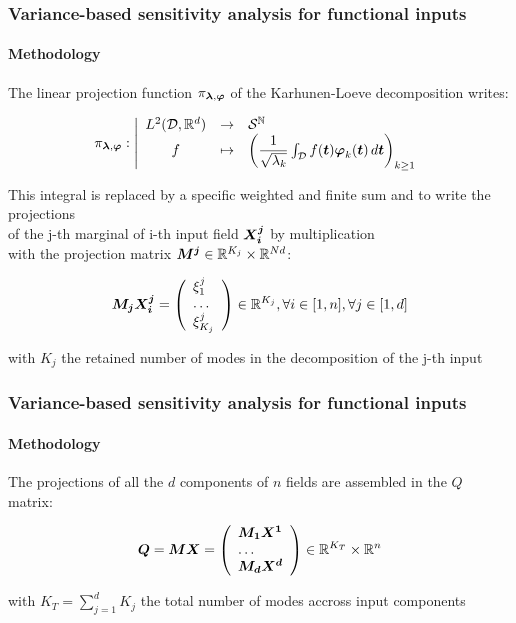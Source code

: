 \documentclass[aspectratio=169]{beamer}
\begin{document}
\begin{frame}
\frametitle{Variance-based sensitivity analysis for functional inputs}

\framesubtitle{Methodology}

The linear projection function $\pi_{ {\mathbf{\boldsymbol{{\lambda}}}}, {\mathbf{\boldsymbol{{\varphi}}}}}$ of
the Karhunen-Loeve decomposition writes:

$$
    \pi_{{\mathbf{\boldsymbol{{\lambda}}}}, {\mathbf{\boldsymbol{{\varphi}}}}}: \left|
      \begin{array}{ccl}
        L^2({\mathcal D}, \mathbb{R}^d) & \rightarrow & {\mathcal S}^{{\mathbb N}} \\
        f & \mapsto &\left(\dfrac{1}{\sqrt{\lambda_k}}\int_{{\mathcal D}}f({\mathbf{\boldsymbol{{t}}}}) {\mathbf{\boldsymbol{{\varphi}}}}_k({\mathbf{\boldsymbol{{t}}}})\, d{\mathbf{\boldsymbol{{t}}}}\right)_{k \geq 1}
      \end{array}
    \right.
$$

This integral is replaced by a specific weighted and finite sum and to write the projections\\
of the j-th marginal of i-th input field ${\mathbf{\boldsymbol{{X_i^j}}}}$ by multiplication\\
with the projection matrix ${{\mathbf{\boldsymbol{{{\mathbf{\boldsymbol{{M^j}}}}}}}}} \in \mathbb{R}^{K_j} \times \mathbb{R}^{Nd}$:

$$
    {{\mathbf{\boldsymbol{{{\mathbf{\boldsymbol{{M_j}}}}}}}}} {\mathbf{\boldsymbol{{X_i^j}}}} = \left( \begin{array}{l} \xi_1^j \\ \dots \\ \xi_{K_j}^j \end{array} \right)
    \in \mathbb{R}^{K_j}, \forall i \in [1, n], \forall j \in [1, d]
$$

with $K_j$ the retained number of modes in the decomposition of the j-th input

\end{frame}

\begin{frame}
\frametitle{Variance-based sensitivity analysis for functional inputs}

\framesubtitle{Methodology}

The projections of all the $d$ components of $n$ fields are assembled in the $Q$ matrix:

$$
        {{\mathbf{\boldsymbol{{{\mathbf{\boldsymbol{{Q}}}}}}}}} = {{\mathbf{\boldsymbol{{{\mathbf{\boldsymbol{{M}}}}}}}}} {{\mathbf{\boldsymbol{{{\mathbf{\boldsymbol{{X}}}}}}}}} =
        \left(
          \begin{array}{l}
            {{\mathbf{\boldsymbol{{{\mathbf{\boldsymbol{{M_1}}}}}}}}} {{\mathbf{\boldsymbol{{{\mathbf{\boldsymbol{{X^1}}}}}}}}} \\
            \dots \\
            {{\mathbf{\boldsymbol{{{\mathbf{\boldsymbol{{M_d}}}}}}}}} {{\mathbf{\boldsymbol{{{\mathbf{\boldsymbol{{X^d}}}}}}}}}
          \end{array}
        \right) \in \mathbb{R}^{K_T} \times \mathbb{R}^n
$$

with $K_T = \sum_{j=1}^d{K_j}$ the total number of modes accross input components

\end{frame}
\end{document}

